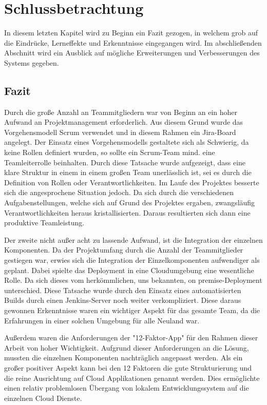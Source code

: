 \section{Schlussbetrachtung}
In diesem letzten Kapitel wird zu Beginn ein Fazit gezogen, in welchem grob auf die Eindrücke, Lerneffekte und Erkenntnisse eingegangen wird. Im abschließenden Abschnitt wird ein Ausblick auf mögliche Erweiterungen und Verbesserungen des Systems gegeben. 
\subsection{Fazit}

Durch die große Anzahl an Teammitgliedern war von Beginn an ein hoher Aufwand an Projektmanagement erforderlich. Aus diesem Grund wurde das Vorgehensmodell Scrum verwendet und in diesem Rahmen ein Jira-Board angelegt. Der Einsatz eines Vorgehensmodells gestaltete sich als Schwierig, da keine Rollen definiert wurden, so sollte ein Scrum-Team mind. eine Teamleiterrolle beinhalten. Durch diese Tatsache wurde aufgezeigt, dass eine klare Struktur in einem in einem großen Team unerlässlich ist, sei es durch die Definition von Rollen oder Verantwortlichkeiten. 
Im Laufe des Projektes besserte sich die angesprochene Situation jedoch. Da sich durch die verschiedenen Aufgabenstellungen, welche sich auf Grund des Projektes ergaben, zwangsläufig Verantwortlichkeiten heraus kristallisierten. 
Daraus resultierten sich dann eine produktive Teamleistung. 

Der zweite nicht außer acht zu lassende Aufwand, ist die Integration der einzelnen Komponenten. 
Da der Projektumfang durch die Anzahl der Teammitglieder gestiegen war, erwies sich die Integration der Einzelkomponenten aufwendiger als geplant. Dabei spielte das Deployment in eine Cloudumgebung eine wesentliche Rolle. Da sich dieses vom herkömmlichen, uns bekannten, on premise-Deployment unterschied. Diese Tatsache wurde durch den Einsatz eines automatisierten Builds durch einen Jenkins-Server noch weiter verkompliziert. 
Diese daraus gewonnen Erkenntnisse waren ein wichtiger Aspekt für das gesamte Team, da die Erfahrungen in einer solchen Umgebung für alle Neuland war. 

Außerdem waren die Anforderungen der "12-Faktor-App" für den Rahmen dieser Arbeit von hoher Wichtigkeit. Aufgrund dieser Anforderungen an die Lösung, mussten die einzelnen Komponenten nachträglich angepasst werden. Als ein großer positiver Aspekt kann bei den 12 Faktoren die gute Strukturierung und die reine Ausrichtung auf Cloud Applikationen genannt werden. Dies ermöglichte einen relativ problemlosen Übergang von lokalem Entwicklungssystem auf die einzelnen Cloud Dienste. 

